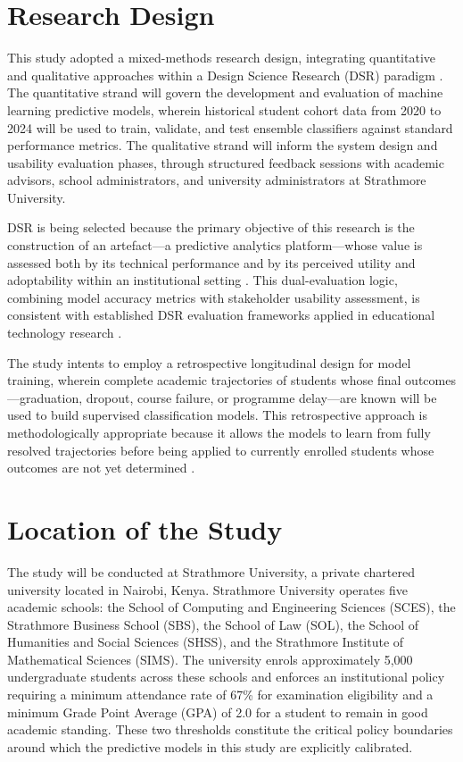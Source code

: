\documentclass[12pt]{report}
\begin{document}
\section{Research Design}

This study adopted a mixed-methods research design, integrating quantitative and
qualitative approaches within a Design Science Research (DSR) paradigm
\parencite{peffers2007design}. The quantitative strand will govern the
development and evaluation of machine learning predictive models, wherein historical
student cohort data from 2020 to 2024 will be used to train, validate, and test ensemble
classifiers against standard performance metrics. The qualitative strand will inform the
system design and usability evaluation phases, through structured feedback sessions
with academic advisors, school administrators, and university administrators at
Strathmore University.

DSR is being selected because the primary objective of this research is the construction of
an artefact---a predictive analytics platform---whose value is assessed both by its
technical performance and by its perceived utility and adoptability within an
institutional setting \parencite{hevner2004design}. This dual-evaluation logic, combining
model accuracy metrics with stakeholder usability assessment, is consistent with
established DSR evaluation frameworks applied in educational technology research
\parencite{sein2011action, venable2016feds}.

The study intents to employ a retrospective longitudinal design for model training, wherein
complete academic trajectories of students whose final outcomes---graduation, dropout,
course failure, or programme delay---are known will be used to build supervised
classification models. This retrospective approach is methodologically appropriate
because it allows the models to learn from fully resolved trajectories before being
applied to currently enrolled students whose outcomes are not yet determined
\parencite{hassen2020, bettahi2025}.

\section{Location of the Study}

The study will be conducted at Strathmore University, a private chartered university
located in Nairobi, Kenya. Strathmore University operates five academic schools:
the School of Computing and Engineering Sciences (SCES), the Strathmore Business
School (SBS), the School of Law (SOL), the School of Humanities and Social Sciences
(SHSS), and the Strathmore Institute of Mathematical Sciences (SIMS). The
university enrols approximately 5,000 undergraduate students across these schools
and enforces an institutional policy requiring a minimum attendance rate of 67\% for
examination eligibility and a minimum Grade Point Average (GPA) of 2.0 for a
student to remain in good academic standing. These two thresholds constitute the
critical policy boundaries around which the predictive models in this study are
explicitly calibrated.
\end{document}
